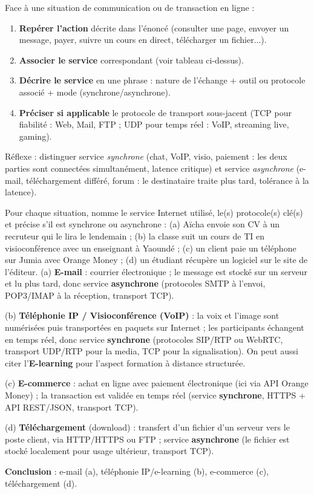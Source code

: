 \documentclass[11pt]{article}
\begin{document}
\begin{methode}
Face à une situation de communication ou de transaction en ligne :
\begin{enumerate}
\item \textbf{Repérer l'action} décrite dans l'énoncé (consulter une page, envoyer un message, payer, suivre un cours en direct, télécharger un fichier...).
\item \textbf{Associer le service} correspondant (voir tableau ci-dessus).
\item \textbf{Décrire le service} en une phrase : nature de l'échange + outil ou protocole associé + mode (synchrone/asynchrone).
\item \textbf{Préciser si applicable} le protocole de transport sous-jacent (TCP pour fiabilité : Web, Mail, FTP ; UDP pour temps réel : VoIP, streaming live, gaming).
\end{enumerate}
Réflexe : distinguer service \emph{synchrone} (chat, VoIP, visio, paiement : les deux parties sont connectées simultanément, latence critique) et service \emph{asynchrone} (e-mail, téléchargement différé, forum : le destinataire traite plus tard, tolérance à la latence).
\end{methode}

\begin{exoresolu}
Pour chaque situation, nomme le service Internet utilisé, le(s) protocole(s) clé(s) et précise s'il est synchrone ou asynchrone : 
(a) Aïcha envoie son CV à un recruteur qui le lira le lendemain ; 
(b) la classe suit un cours de TI en visioconférence avec un enseignant à Yaoundé ; 
(c) un client paie un téléphone sur Jumia avec Orange Money ; 
(d) un étudiant récupère un logiciel sur le site de l'éditeur.
\tcblower
(a) \textbf{E-mail} : courrier électronique ; le message est stocké sur un serveur et lu plus tard, donc service \textbf{asynchrone} (protocoles SMTP à l'envoi, POP3/IMAP à la réception, transport TCP).

(b) \textbf{Téléphonie IP / Visioconférence (VoIP)} : la voix et l'image sont numérisées puis transportées en paquets sur Internet ; les participants échangent en temps réel, donc service \textbf{synchrone} (protocoles SIP/RTP ou WebRTC, transport UDP/RTP pour la media, TCP pour la signalisation). On peut aussi citer l'\textbf{E-learning} pour l'aspect formation à distance structurée.

(c) \textbf{E-commerce} : achat en ligne avec paiement électronique (ici via API Orange Money) ; la transaction est validée en temps réel (service \textbf{synchrone}, HTTPS + API REST/JSON, transport TCP).

(d) \textbf{Téléchargement} (download) : transfert d'un fichier d'un serveur vers le poste client, via HTTP/HTTPS ou FTP ; service \textbf{asynchrone} (le fichier est stocké localement pour usage ultérieur, transport TCP).

\textbf{Conclusion} : e-mail (a), téléphonie IP/e-learning (b), e-commerce (c), téléchargement (d).
\end{exoresolu}
\end{document}

